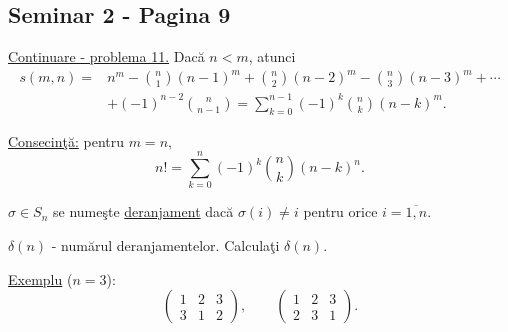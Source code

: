 
\subsection*{Seminar 2 - Pagina 9}

\noindent\underline{Continuare - problema 11.} Dacă $n<m$, atunci
\[
\begin{aligned}
 s(m,n)={}&n^m-\binom{n}{1}(n-1)^m
          +\binom{n}{2}(n-2)^m-\binom{n}{3}(n-3)^m+\cdots\\
         &+(-1)^{n-2}\binom{n}{n-1}
          =\boxed{\displaystyle\sum_{k=0}^{n-1}(-1)^k\binom{n}{k}(n-k)^m}.
\end{aligned}
\]

\noindent\underline{Consecinţă:} pentru $m=n$,
\[
 \boxed{\displaystyle n!=\sum_{k=0}^{n}(-1)^k\binom{n}{k}(n-k)^n}.
\]

\bigskip
\noindent{}\quad $\sigma\in S_n$ se numeşte \underline{deranjament}
 dacă $\sigma(i)\neq i$ pentru orice $i=\overline{1,n}$.

\noindent $\delta(n)$ - numărul deranjamentelor. Calculaţi $\delta(n)$.

\noindent\underline{Exemplu} ($n=3$):
\[
 \begin{pmatrix}1&2&3\\3&1&2\end{pmatrix},\qquad
 \begin{pmatrix}1&2&3\\2&3&1\end{pmatrix}.
\]

